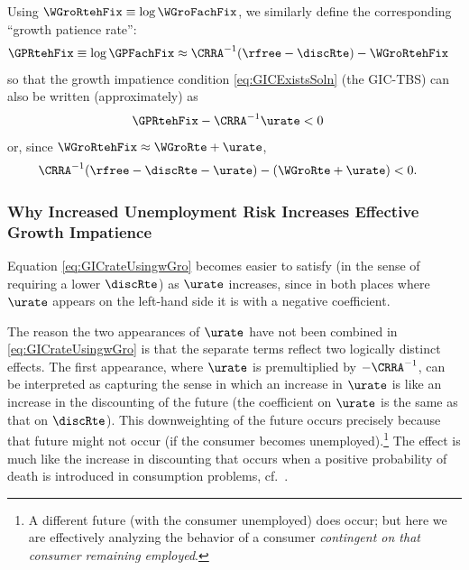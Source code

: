 \documentclass{econark}
\begin{document}
Using $\WGroRtehFix \equiv \log \WGroFachFix$, we similarly define the corresponding ``growth patience rate'':
\begin{equation}\begin{gathered}\begin{aligned}
  \GPRtehFix & \equiv  \log \GPFachFix \approx \CRRA^{-1}(\rfree-\discRte) - \WGroRtehFix
\end{aligned}\end{gathered}\end{equation}
so that the growth impatience condition \eqref{eq:GICExistsSoln} (the GIC-TBS) can also be written (approximately) as
\begin{equation}\begin{gathered}\begin{aligned}
  \GPRtehFix - \CRRA^{-1}\urate & <  0   \label{eq:GICrateUsingpGro}
\end{aligned}\end{gathered}\end{equation}
or, since $\WGroRtehFix \approx \WGroRte+\urate$, 
\begin{equation}\begin{gathered}\begin{aligned}
 \CRRA^{-1}(\rfree-\discRte-\urate)-(\WGroRte+\urate) & <  0 \label{eq:GICrateUsingwGro}
.
\end{aligned}\end{gathered}\end{equation}

\subsubsection{Why Increased Unemployment Risk Increases Effective Growth Impatience}\label{sec:URiskGrowthImpatience}

Equation \eqref{eq:GICrateUsingwGro} becomes easier to satisfy (in the sense of requiring  a lower $\discRte$) as $\urate$ increases, since in both places where $\urate$ appears on the left-hand side it is with a negative coefficient.

The reason the two appearances of $\urate$ have not been combined in \eqref{eq:GICrateUsingwGro} is that the separate 
terms reflect two logically distinct effects.  The first appearance, where $\urate$ is premultiplied by $-\CRRA^{-1}$, 
can be interpreted as capturing the sense in which an increase in $\urate$ is like an increase in the discounting of the future (the
coefficient on $\urate$ is the same as that on $\discRte$).  This downweighting of the future occurs precisely because that future
might not occur (if the consumer becomes unemployed).\footnote{A different future (with the consumer unemployed) does occur; but here we are effectively analyzing the behavior of a consumer {\it contingent on that consumer remaining employed}.}  The effect is much like the increase in discounting that occurs 
when a positive probability of death is introduced in consumption problems, cf.~\cite{blanchardFinite}.
\end{document}
